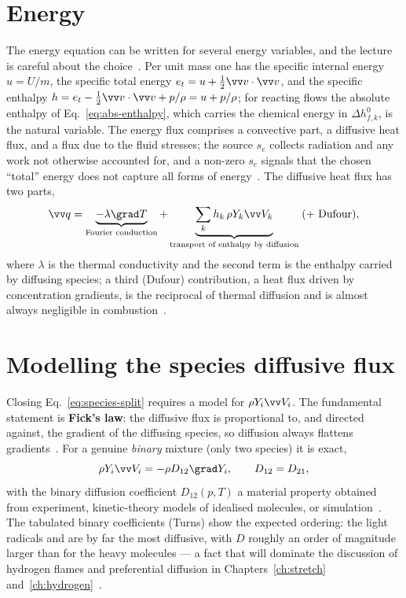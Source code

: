 \section{Energy}

The energy equation can be written for several energy variables, and the lecture is careful about the choice~\cite{lecture8}. Per unit mass one has the specific internal energy $u=U/m$, the specific total energy $e_t=u+\tfrac12\vv v\cdot\vv v$, and the specific enthalpy $h=e_t-\tfrac12\vv v\cdot\vv v+p/\rho=u+p/\rho$; for reacting flows the absolute enthalpy of Eq.~\eqref{eq:abs-enthalpy}, which carries the chemical energy in $\Delta h_{f,k}^0$, is the natural variable. The energy flux comprises a convective part, a diffusive heat flux, and a flux due to the fluid stresses; the source $s_e$ collects radiation and any work not otherwise accounted for, and a non-zero $s_e$ signals that the chosen ``total'' energy does not capture all forms of energy~\cite{lecture8}. The diffusive heat flux has two parts,
\begin{equation}
\vv q=\underbrace{-\lambda\grad T}_{\text{Fourier conduction}}+\underbrace{\sum_k h_k\,\rho Y_k\vv V_k}_{\text{transport of enthalpy by diffusion}}\;(+\ \text{Dufour}),
\label{eq:heatflux}
\end{equation}
where $\lambda$ is the thermal conductivity and the second term is the enthalpy carried by diffusing species; a third (Dufour) contribution, a heat flux driven by concentration gradients, is the reciprocal of thermal diffusion and is almost always negligible in combustion~\cite{lecture8,kuo2005conservation}.

\section{Modelling the species diffusive flux}

Closing Eq.~\eqref{eq:species-split} requires a model for $\rho Y_i\vv V_i$. The fundamental statement is \textbf{Fick's law}: the diffusive flux is proportional to, and directed against, the gradient of the diffusing species, so diffusion always flattens gradients~\cite{lecture8}. For a genuine \emph{binary} mixture (only two species) it is exact,
\begin{equation}
\rho Y_i\vv V_i=-\rho D_{12}\grad Y_i,\qquad D_{12}=D_{21},
\label{eq:fick}
\end{equation}
with the binary diffusion coefficient $D_{12}(p,T)$ a material property obtained from experiment, kinetic-theory models of idealised molecules, or simulation~\cite{lecture8,warnatz2006combustion}. The tabulated binary coefficients (Turns) show the expected ordering: the light radicals  and  are by far the most diffusive, with $D$ roughly an order of magnitude larger than for the heavy molecules --- a fact that will dominate the discussion of hydrogen flames and preferential diffusion in Chapters~\ref{ch:stretch} and~\ref{ch:hydrogen}~\cite{lecture8,turns2000introduction}.

